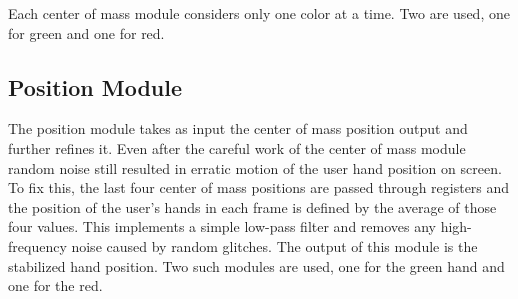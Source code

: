 Each center of mass module considers only one color at a time. Two are used, one
for green and one for red.

\subsection{Position Module}

The position module takes as input the center of mass position output and
further refines it. Even after the careful work of the center of mass module
random noise still resulted in erratic motion of the user hand position on
screen. To fix this, the last four center of mass positions are passed through
registers and the position of the user's hands in each frame is defined by the
average of those four values. This implements a simple low-pass filter and
removes any high-frequency noise caused by random glitches. The output of this
module is the stabilized hand position. Two such modules are used, one for the
green hand and one for the red.

